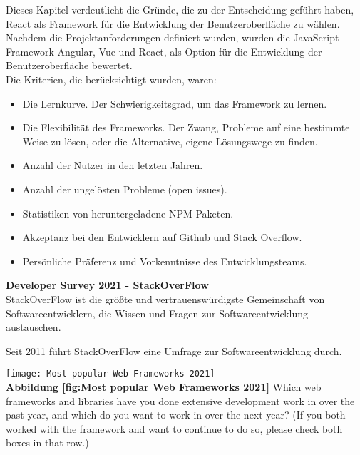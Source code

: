 \begin{flushleft}
Dieses Kapitel verdeutlicht die Gründe, die zu der Entscheidung geführt haben, React als Framework für die Entwicklung der Benutzeroberfläche zu wählen.
\\
Nachdem die Projektanforderungen definiert wurden, wurden die JavaScript Framework Angular, Vue und React, als Option für die Entwicklung der Benutzeroberfläche bewertet.
\\
Die Kriterien, die berücksichtigt wurden, waren:

\begin{itemize}
  \item
  Die Lernkurve. Der Schwierigkeitsgrad, um das Framework zu lernen.
  
  \item 
  Die Flexibilität des Frameworks.
  Der Zwang, Probleme auf eine bestimmte Weise zu lösen, oder die Alternative, eigene Lösungswege zu finden.
  
  \item 
  Anzahl der Nutzer in den letzten Jahren.
  
  \item 
  Anzahl der ungelösten Probleme (open issues).
  
  \item 
  Statistiken von heruntergeladene NPM-Paketen.
  
  \item 
  Akzeptanz bei den Entwicklern auf Github und Stack Overflow.

  \item
  Persönliche Präferenz und Vorkenntnisse des Entwicklungsteams.
\end{itemize}

\end{flushleft}

\textbf{Developer Survey 2021 - StackOverFlow}\\
StackOverFlow ist die größte und vertrauenswürdigste Gemeinschaft von Softwareentwicklern, die Wissen und Fragen zur Softwareentwicklung austauschen.

Seit 2011 führt StackOverFlow eine Umfrage zur Softwareentwicklung durch.
\begin{center}
  \texttt{[image: Most popular Web Frameworks 2021]}\label{fig:Developer Survey 2021}\\
  \textbf{Abbildung \autoref{fig:Most popular Web Frameworks 2021}} 
  Which web frameworks and libraries have you done extensive development work in over the past year, and which do you want to work in over the next year? (If you both worked with the framework and want to continue to do so, please check both boxes in that row.)
  \end{center}
  {\cite{SO01}}

